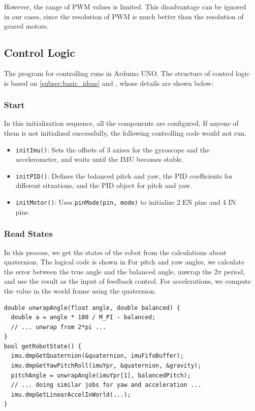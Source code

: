 \documentclass[9pt,a4paper,twocolumn]{tau-class/tau}
\begin{document}
However, the range of PWM values is limited. This disadvantage can be ignored in our cases, since the resolution of PWM is much better than the resolution of geared motors.


\subsection{Control Logic}
The program for controlling runs in Arduino UNO. The structure of control logic is based on \ref{subsec:basic_ideas} and , whose details are shown below:

\subsubsection{Start}
In this initialization sequence, all the components are configured. If anyone of them is not initialized successfully, the following controlling code would not run.
\begin{itemize}
  \item \texttt{initImu()}: Sets the offsets of 3 axises for the gyroscope and the accelerometer, and waits until the IMU becomes stable.
  \item \texttt{initPID()}: Defines the balanced pitch and yaw, the PID coefficients for different situations, and the PID object for pitch and yaw.
  \item \texttt{initMotor()}: Uses \texttt{pinMode(pin, mode)} to initialize 2 EN pins and 4 IN pins.
\end{itemize}

\subsubsection{Read States}
In this process, we get the states of the robot from the calculations about quaternion. The logical code is shown in  For pitch and yaw angles, we calculate the error between the true angle and the balanced angle, unwrap the $2\pi$ period, and use the result as the input of feedback control. For accelerations, we compute the value in the world frame using the quaternion.

\begin{lstlisting}[caption={Example code of "Read States" process}, label={lst:code_read_states}]
double unwrapAngle(float angle, double balanced) {
  double a = angle * 180 / M_PI - balanced;
  // ... unwrap from 2*pi ...
}
bool getRobotState() {
  imu.dmpGetQuaternion(&quaternion, imuFifoBuffer);
  imu.dmpGetYawPitchRoll(imuYpr, &quaternion, &gravity);
  pitchAngle = unwrapAngle(imuYpr[1], balancedPitch);
  // ... doing similar jobs for yaw and acceleration ...
  imu.dmpGetLinearAccelInWorld(...);
}
\end{lstlisting}
\end{document}
